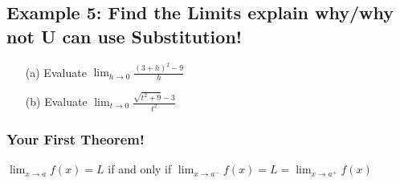\documentclass[10pt]{book}
\theoremstyle{definition}
\begin{document}
\subsection*{Example 5: Find the Limits explain why/why not U can use Substitution!}
\begin{itemize}
\item[(a)] Evaluate $\displaystyle\lim_{h\rightarrow 0}\frac{(3+h)^2-9}{h}$\vspace{3in}
\item[(b)] Evaluate $\displaystyle\lim_{t\rightarrow 0}\frac{\sqrt{t^2+9}-3}{t^2}$
\end{itemize}
\clearpage
\begin{tcolorbox}
\subsubsection*{Your First Theorem!}
$\displaystyle\lim_{x\rightarrow a}f(x)=L$ if and only if
\centering$\displaystyle\lim_{x\rightarrow a^-}f(x)=L=\lim_{x\rightarrow a^+}f(x)$
\end{tcolorbox}
\end{document}

